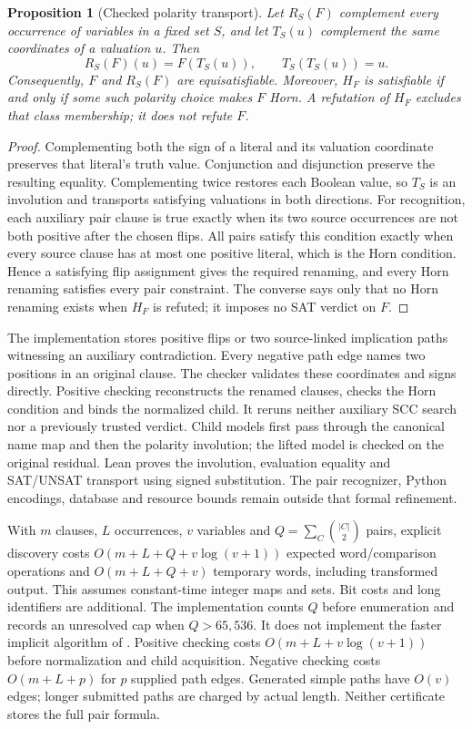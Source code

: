 \documentclass[11pt,a4paper]{article}
\numberwithin{equation}{section}
\theoremstyle{plain}
\newtheorem{proposition}[lemma]{Proposition}
\theoremstyle{definition}
\theoremstyle{remark}
\begin{document}
\begin{proposition}[Checked polarity transport]
\label{prop:polarity-horn}
Let $R_S(F)$ complement every occurrence of variables in a fixed set $S$, and let $T_S(u)$ complement the same coordinates of a valuation $u$. Then
\[
 R_S(F)(u)=F(T_S(u)), \qquad T_S(T_S(u))=u.
\]
Consequently, $F$ and $R_S(F)$ are equisatisfiable. Moreover, $H_F$ is satisfiable if and only if some such polarity choice makes $F$ Horn. A refutation of $H_F$ excludes that class membership; it does not refute $F$.
\end{proposition}
\begin{proof}
Complementing both the sign of a literal and its valuation coordinate preserves that literal's truth value. Conjunction and disjunction preserve the resulting equality. Complementing twice restores each Boolean value, so $T_S$ is an involution and transports satisfying valuations in both directions. For recognition, each auxiliary pair clause is true exactly when its two source occurrences are not both positive after the chosen flips. All pairs satisfy this condition exactly when every source clause has at most one positive literal, which is the Horn condition. Hence a satisfying flip assignment gives the required renaming, and every Horn renaming satisfies every pair constraint. The converse says only that no Horn renaming exists when $H_F$ is refuted; it imposes no SAT verdict on $F$.
\end{proof}

The implementation stores positive flips or two source-linked implication paths witnessing an auxiliary contradiction. Every negative path edge names two positions in an original clause. The checker validates these coordinates and signs directly. Positive checking reconstructs the renamed clauses, checks the Horn condition and binds the normalized child. It reruns neither auxiliary SCC search nor a previously trusted verdict. Child models first pass through the canonical name map and then the polarity involution; the lifted model is checked on the original residual. Lean proves the involution, evaluation equality and SAT/UNSAT transport using signed substitution. The pair recognizer, Python encodings, database and resource bounds remain outside that formal refinement.

With $m$ clauses, $L$ occurrences, $v$ variables and $Q=\sum_C\binom{|C|}{2}$ pairs, explicit discovery costs $O(m+L+Q+v\log(v+1))$ expected word/comparison operations and $O(m+L+Q+v)$ temporary words, including transformed output. This assumes constant-time integer maps and sets. Bit costs and long identifiers are additional. The implementation counts $Q$ before enumeration and records an unresolved cap when $Q>65{,}536$. It does not implement the faster implicit algorithm of \citet{mannila1985renaming}. Positive checking costs $O(m+L+v\log(v+1))$ before normalization and child acquisition. Negative checking costs $O(m+L+p)$ for $p$ supplied path edges. Generated simple paths have $O(v)$ edges; longer submitted paths are charged by actual length. Neither certificate stores the full pair formula.
\end{document}
